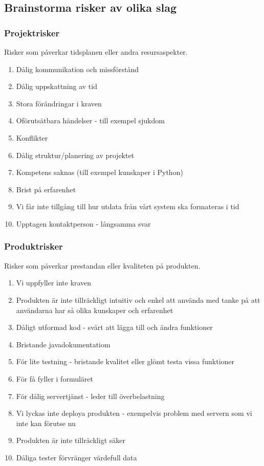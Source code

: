 \documentclass{article}
\begin{document}
\subsection{Brainstorma risker av olika slag}
\subsubsection{Projektrisker}
Risker som påverkar tidsplanen eller andra resursaspekter. 
\begin{enumerate}
\item Dålig kommunikation och missförstånd
\item Dålig uppskattning av tid
\item Stora förändringar i kraven
\item Oförutsätbara händelser - till exempel sjukdom
\item Konflikter
\item Dålig struktur/planering av projektet
\item Kompetens saknas (till exempel kunskaper i Python)
\item Brist på erfarenhet
\item Vi får inte tillgång till hur utdata från vårt system ska formateras i tid
\item Upptagen kontaktperson - långsamma svar
\end{enumerate}

\subsubsection{Produktrisker}
Risker som påverkar prestandan eller kvaliteten på produkten.
\begin{enumerate}
    \item Vi uppfyller inte kraven
    \item Produkten är inte tillräckligt intuitiv och enkel att använda med tanke på att användarna har så olika kunskaper och erfarenhet
    \item Dåligt utformad kod - svårt att lägga till och ändra funktioner
    \item Bristande javadokumentatiom
    \item För lite testning - bristande kvalitet eller glömt testa vissa funktioner
    \item För få fyller i formuläret
    \item För dålig servertjänst - leder till överbelastning
    \item Vi lyckas inte deploya produkten - exempelvis problem med servern som vi inte kan förutse nu
    \item Produkten är inte tillräckligt säker
    \item Dåliga tester förvränger värdefull data
\end{enumerate}
\end{document}
